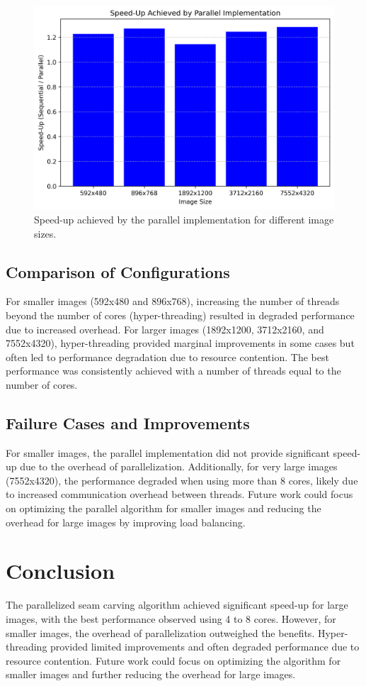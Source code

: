 \documentclass[9pt]{IEEEtran}
\begin{document}
\begin{figure}[h]
    \centering
    \includegraphics[width=1\columnwidth]{speedup.png}
    \caption{Speed-up achieved by the parallel implementation for different image sizes.}
    \label{fig:speedup}
\end{figure}

\subsection{Comparison of Configurations}
For smaller images (592x480 and 896x768), increasing the number of threads beyond the number of cores (hyper-threading) resulted in degraded performance due to increased overhead. For larger images (1892x1200, 3712x2160, and 7552x4320), hyper-threading provided marginal improvements in some cases but often led to performance degradation due to resource contention. The best performance was consistently achieved with a number of threads equal to the number of cores.

\subsection{Failure Cases and Improvements}
For smaller images, the parallel implementation did not provide significant speed-up due to the overhead of parallelization. Additionally, for very large images (7552x4320), the performance degraded when using more than 8 cores, likely due to increased communication overhead between threads. Future work could focus on optimizing the parallel algorithm for smaller images and reducing the overhead for large images by improving load balancing.

\section{Conclusion}

The parallelized seam carving algorithm achieved significant speed-up for large images, with the best performance observed using 4 to 8 cores. However, for smaller images, the overhead of parallelization outweighed the benefits. Hyper-threading provided limited improvements and often degraded performance due to resource contention. Future work could focus on optimizing the algorithm for smaller images and further reducing the overhead for large images.



\end{document}
